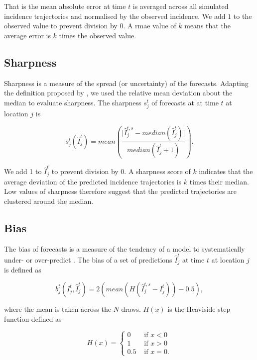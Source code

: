 \documentclass[9pt,twocolumn,twoside,lineno]{pnas-new}
\begin{document}
{That is the mean absolute error at time \(t\) is averaged
across all simulated incidence trajectories and normalised by the
observed incidence. We add \(1\) to the observed value to prevent division
by \(0\). A rmae value of \(k\) means that the average error is \(k\)
times the observed value.

\subsection*{Sharpness}\label{sharpness}

Sharpness is a measure of the spread (or uncertainty) of the forecasts.
Adapting the definition proposed by \cite{funk2017assessing}, we used
the relative mean deviation about the median to evaluate
sharpness. The sharpness $s_{j}^t$ of forecasts at at time \(t\)
at location \(j\) is

\begin{equation*}
s_{j}^{t}(\hat{I}_{j}^{t}) = 
mean 
\left(
\frac{\lvert \hat{I}_{j}^{t, s} - median(\hat{I}_{j}^{t}) \rvert} 
{median\left(\hat{I}_{j}^{t} + 1\right)} 
\right).
\end{equation*}

We add 1 to \(\hat{I}_{j}^{t}\) to prevent division by 0. A sharpness
score of \(k\) indicates that the average deviation of the predicted
incidence trajectories is \(k\) times their median. Low values of
sharpness therefore suggest that the predicted trajectories are
clustered around the median.


\subsection*{Bias}\label{bias}

The bias of forecasts is a measure of the tendency of a model to
systematically under- or over-predict \cite{funk2017assessing}. The bias
of a set of predictions $\hat{I}_{j}^{t}$ at time \(t\) at
location \(j\) is defined as

\begin{equation*}
b_{j}^{t}(I_{j}^{t}, \hat{I}_{j}^{t}) = 
2 \left( mean \left( H \left (\hat{I}_{j}^{t, s} - I_{j}^{t} \right)
\right) - 0.5 \right),
\end{equation*}

where the mean is taken across the \(N\) draws. \(H(x)\) is the Heaviside
step function defined as

\begin{equation*}
H(x) = \begin{cases} 
0 & \text{ if } x < 0 \\ 
1 & \text{ if } x > 0 \\
0.5 & \text{ if } x = 0. 
\end{cases} 
\end{equation*}

}
\end{document}
